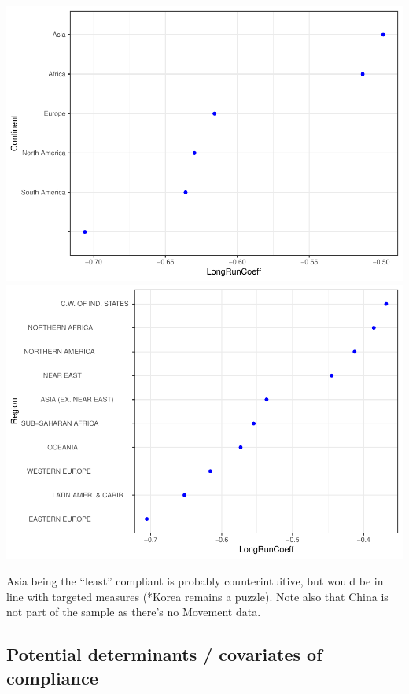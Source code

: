 \documentclass[
  english,
  ,doc,floatsintext]{apa6}
\begin{document}
\hypertarget{htmlwidget-9b926721de3670c8b327}{}

\includegraphics{LR_explore_OK_comms_files/figure-latex/coeffs by-1.pdf} \includegraphics{LR_explore_OK_comms_files/figure-latex/coeffs by-2.pdf}

Asia being the \enquote{least} compliant is probably counterintuitive, but would be in line with targeted measures (*Korea remains a puzzle). Note also that China is not part of the sample as there's no Movement data.

\hypertarget{potential-determinants-covariates-of-compliance}{%
\subsection{Potential determinants / covariates of compliance}\label{potential-determinants-covariates-of-compliance}}
\end{document}
